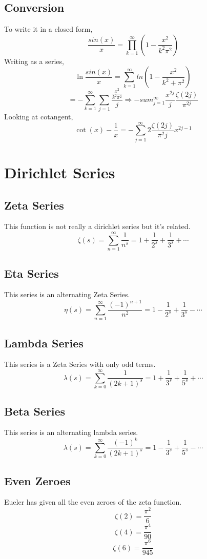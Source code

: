 \documentclass[../main.tex]{subfiles}
\begin{document}
    \subsection{Conversion}
        To write it in a closed form,
        $$\frac{sin(x)}{x}=\prod_{k=1}^{\infty}(1-\frac{x^{2}}{k^{2}\pi^{2}})$$
        Writing as a series,
        $$\ln\frac{sin(x)}{x}=\sum_{k=1}^{\infty}ln\left(1-\frac{x^{2}}{k^{2}+\pi^{2}}\right)$$
        $$=-\sum_{k=1}^{\infty}\sum_{j=1}\frac{\frac{x^{2}}{k^{2}\pi^{2}}}{j}\Rightarrow -sum_{j=1}^{\infty}\frac{x^{2j}}{j}\frac{\zeta(2j)}{\pi^{2j}}$$
        Looking at cotangent,
        $$\cot(x)-\frac{1}{x}=-\sum_{j=1}^{\infty}2\frac{\zeta(2j)}{\pi^{2}j}x^{2j-1}$$

\section{Dirichlet Series}
    \subsection{Zeta Series}
        This function is not really a dirichlet series but it's related.
        $$\zeta(s)=\sum_{n=1}^{\infty}\frac{1}{n^{s}}=1+\frac{1}{2^{s}}+\frac{1}{3^{s}}+\cdots$$
    \subsection{Eta Series}
        This series is an alternating Zeta Series.
        $$\eta(s)=\sum_{n=1}^{\infty}\frac{(-1)^{n+1}}{n^{2}}=1-\frac{1}{2^{s}}+\frac{1}{3^{s}}-\cdots$$
    \subsection{Lambda Series}
        This series is a Zeta Series with only odd terms.
        $$\lambda(s)=\sum_{k=0}^{\infty}\frac{1}{(2k+1)^{s}}=1+\frac{1}{3^{s}}+\frac{1}{5^{s}}+\cdots$$
    \subsection{Beta Series}
        This series is an alternating lambda series.
        $$\lambda(s)=\sum_{k=0}^{\infty}\frac{(-1)^{k}}{(2k+1)^{s}}=1-\frac{1}{3^{s}}+\frac{1}{5^{s}}-\cdots$$
    \subsection{Even Zeroes}
        Eueler has given all the even zeroes of the zeta function.
        $$\zeta(2)=\frac{\pi^{2}}{6}$$
        $$\zeta(4)=\frac{\pi^{4}}{90}$$
        $$\zeta(6)=\frac{\pi^{6}}{945}$$
\end{document}
